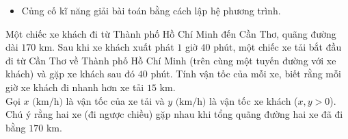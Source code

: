 \muctieu

\begin{itemize}
	\item Củng cố kĩ năng giải bài toán bằng cách lập hệ phương trình.
\end{itemize}

\noidungsanpham

\begin{luyentap}
	Một chiếc xe khách đi từ Thành phố Hồ Chí Minh đến Cần Thơ, quãng đường dài $170\text{ km}$. Sau khi xe khách xuất phát $1$ giờ $40$ phút, một chiếc xe tải bắt đầu đi từ Cần Thơ về Thành phố Hồ Chí Minh (trên cùng một tuyến đường với xe khách) và gặp xe khách sau đó $40$ phút. Tính vận tốc của mỗi xe, biết rằng mỗi giờ xe khách đi nhanh hơn xe tải $15\text{ km}$.
	\doicot
	\huongdan\\
	Gọi $x\text{ (km/h)}$ là vận tốc của xe tải và $y\text{ (km/h)}$ là vận tốc xe khách ($x, y > 0$). Chú ý rằng hai xe (đi ngược chiều) gặp nhau khi tổng quãng đường hai xe đã đi bằng $170\text{ km}$.
\end{luyentap}

